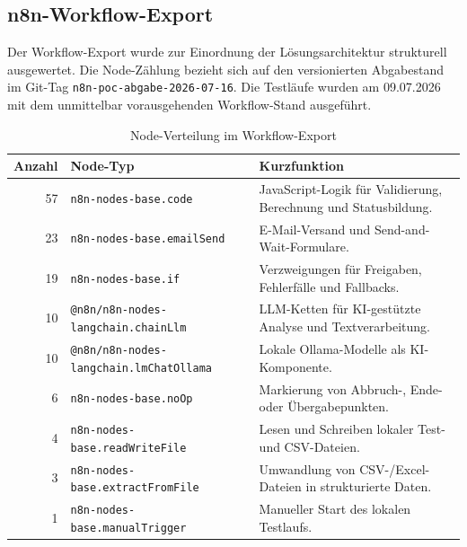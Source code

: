 \documentclass[a4paper,12pt]{article}
\begin{document}
\begin{longtable}{@{}p{}p{}p{}@{}}
\end{longtable}
\normalsize

\clearpage
\subsection{n8n-Workflow-Export}
\label{anhang:n8n-workflow-export}
Der Workflow-Export wurde zur Einordnung der Lösungsarchitektur strukturell ausgewertet. Die Node-Zählung bezieht sich auf den versionierten Abgabestand im Git-Tag \texttt{n8n-poc-abgabe-2026-07-16}. Die Testläufe wurden am 09.07.2026 mit dem unmittelbar vorausgehenden Workflow-Stand ausgeführt.

\begin{table}[H]
    \centering
    \caption{Node-Verteilung im Workflow-Export}
    \label{tab:n8n-node-verteilung}
    \small
    \begin{tabularx}{\textwidth}{@{}rp{5.4cm}X@{}}
        \toprule
        Anzahl & Node-Typ & Kurzfunktion \\
        \midrule
        57 & \texttt{n8n-nodes-base.code} & JavaScript-Logik für Validierung, Berechnung und Statusbildung. \\
        23 & \texttt{n8n-nodes-base.emailSend} & E-Mail-Versand und Send-and-Wait-Formulare. \\
        19 & \texttt{n8n-nodes-base.if} & Verzweigungen für Freigaben, Fehlerfälle und Fallbacks. \\
        10 & \texttt{@n8n/n8n-nodes-}\newline\texttt{langchain.chainLlm} & LLM-Ketten für KI-gestützte Analyse und Textverarbeitung. \\
        10 & \texttt{@n8n/n8n-nodes-}\newline\texttt{langchain.lmChatOllama} & Lokale Ollama-Modelle als KI-Komponente. \\
        6 & \texttt{n8n-nodes-base.noOp} & Markierung von Abbruch-, Ende- oder Übergabepunkten. \\
        4 & \texttt{n8n-nodes-base.}\newline\texttt{readWriteFile} & Lesen und Schreiben lokaler Test- und CSV-Dateien. \\
        3 & \texttt{n8n-nodes-base.}\newline\texttt{extractFromFile} & Umwandlung von CSV-/Excel-Dateien in strukturierte Daten. \\
        1 & \texttt{n8n-nodes-base.}\newline\texttt{manualTrigger} & Manueller Start des lokalen Testlaufs. \\

\end{tabularx}
\end{table}
\end{document}

